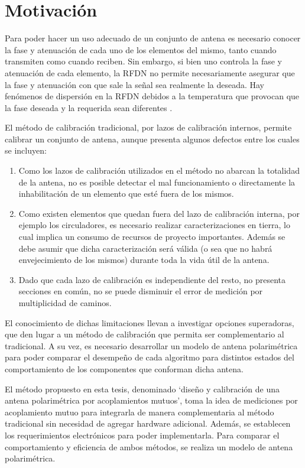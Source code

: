 \section{Motivación} \label{sc:motivation}

Para poder hacer un uso adecuado de un conjunto de antena es necesario conocer la fase y atenuación de cada uno de los elementos
del mismo, tanto cuando transmiten como cuando reciben. Sin embargo, si bien uno controla la fase y atenuación de cada elemento,
la RFDN no permite necesariamente asegurar que la fase y atenuación con que sale la señal sea realmente la deseada. Hay 
fenómenos de dispersión en la RFDN debidos a la temperatura que provocan que la fase deseada y la requerida sean diferentes 
\cite{Keizer2011}.

El método de calibración tradicional, por lazos de calibración internos, permite calibrar un conjunto de antena, aunque
presenta algunos defectos entre los cuales se incluyen:

\begin{enumerate}
    \item Como los lazos de calibración utilizados en el método no abarcan la totalidad de la antena, no es posible detectar el
		mal funcionamiento o directamente la inhabilitación de un elemento que esté fuera de los mismos. 
    \item Como existen elementos que quedan fuera del lazo de calibración interna, por ejemplo los circuladores, es necesario
		realizar caracterizaciones en tierra, lo cual implica un consumo de recursos de proyecto importantes. Además se debe 
		asumir que dicha caracterización será válida (o sea que no habrá envejecimiento de los mismos) durante toda la vida útil
		de la antena.
    \item Dado que cada lazo de calibración es independiente del resto, no presenta secciones en común, no se puede disminuir
		el error de medición por multiplicidad de caminos.
\end{enumerate}

El conocimiento de dichas limitaciones llevan a investigar opciones superadoras, que den lugar a un método de calibración que 
permita ser complementario al tradicional. A su vez, es necesario desarrollar un modelo de antena polarimétrica para poder 
comparar el desempeño de cada algoritmo para distintos estados del comportamiento de los componentes que conforman dicha antena.

El método propuesto en esta tesis, denominado \enquote*{diseño y calibración de una antena polarimétrica por acoplamientos
mutuos}, toma la idea de mediciones por acoplamiento mutuo \cite{Agrawal2003}\cite{Shipley2000}\cite{Aumann1989}\cite{Chen2012}
para integrarla de manera complementaria al método tradicional sin necesidad de agregar hardware adicional. Además, se establecen
los requerimientos electrónicos para poder implementarla. Para comparar el comportamiento y eficiencia de ambos métodos, se
realiza un modelo de antena polarimétrica.



